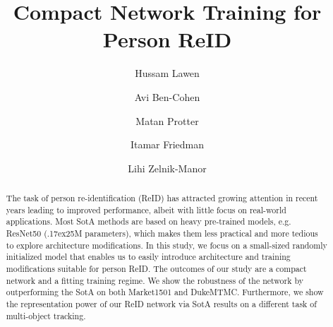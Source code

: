 \documentclass[sigconf]{acmart}
\begin{document}
\fancyhead{}


\title{Compact Network Training for Person ReID}

\author{Hussam Lawen}

\author{Avi Ben-Cohen}
\authornotemark[1]

  \author{Matan Protter}

    \author{Itamar Friedman}

      \author{Lihi Zelnik-Manor}



\renewcommand{\shortauthors}{Lawen and Ben-Cohen, et al.}

\begin{abstract}
   The task of person re-identification (ReID) has attracted growing attention in recent years leading to improved performance, albeit with little focus on real-world applications.
   Most SotA methods are based on heavy pre-trained models, e.g. ResNet50 ({\raise.17ex\hbox{}}25M parameters), which makes them less practical and more tedious to explore architecture modifications.
In this study, we focus on a small-sized randomly initialized model that enables us to easily introduce architecture and training modifications suitable for person ReID.
The outcomes of our study are a compact network and a fitting training regime.
   We show the robustness of the network by outperforming the SotA on both Market1501 and DukeMTMC. Furthermore, we show the representation power of our ReID network via SotA results on a different task of multi-object tracking.
\end{abstract}





\maketitle
\end{document}
